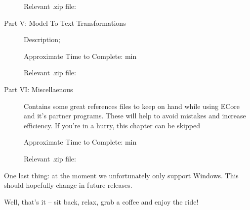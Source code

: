 \begin{description}
Relevant .zip file:

\item[Part V: Model To Text Transformations] Description;

Approximate Time to Complete: min

Relevant .zip file:

\item[Part VI: Miscellaenous] Contains some great references files to keep on hand while using ECore and it's partner programs. These will help to avoid mistakes and increase efficiency. %
If you're in a hurry, this chapter can be skipped

Approximate Time to Complete: min

Relevant .zip file:
\end{description}

One last thing: at the moment we unfortunately only support Windows. This should hopefully change in future releases.

Well, that's it -- sit back, relax, grab a coffee and enjoy the ride!

